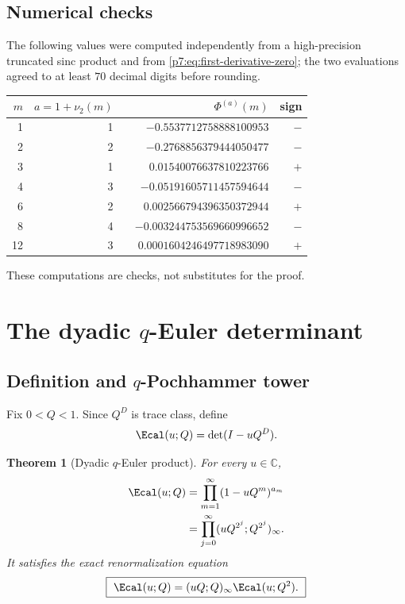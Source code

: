 \documentclass[11pt]{article}
\numberwithin{equation}{section}
\newtheorem{theorem}{Theorem}[section]
\theoremstyle{definition}
\theoremstyle{remark}
\newcommand{\C}{\mathbb C}
\begin{document}
\subsection{Numerical checks}

The following values were computed independently from a high-precision truncated sinc product and from \cref{p7:eq:first-derivative-zero}; the two evaluations agreed to at least $70$ decimal digits before rounding.
\begin{center}
\begin{tabular}{@{}rrrr@{}}
\toprule
$m$ & $a=1+\nu_2(m)$ & $\Phi^{(a)}(m)$ & sign\\
\midrule
1  & 1 & $-0.5537712758888100953$ & $-$\\
2  & 2 & $-0.2768856379444050477$ & $-$\\
3  & 1 & $\phantom{-}0.01540076637810223766$ & $+$\\
4  & 3 & $-0.05191605711457594644$ & $-$\\
6  & 2 & $\phantom{-}0.002566794396350372944$ & $+$\\
8  & 4 & $-0.003244753569660996652$ & $-$\\
12 & 3 & $\phantom{-}0.0001604246497718983090$ & $+$\\
\bottomrule
\end{tabular}
\end{center}
These computations are checks, not substitutes for the proof.

\section{The dyadic $q$-Euler determinant}

\subsection{Definition and $q$-Pochhammer tower}

Fix $0<Q<1$.  Since $Q^D$ is trace class, define
\begin{equation}\label{p7:eq:E-def}
 \Ecal(u;Q)=\det(I-uQ^D).
\end{equation}

\begin{theorem}[Dyadic $q$-Euler product]\label{p7:thm:E-product}
For every $u\in\C$,
\begin{align}
 \Ecal(u;Q)
 &=\prod_{m=1}^{\infty}(1-uQ^m)^{a_m}\label{p7:eq:E-mult}\\
 &=\prod_{j=0}^{\infty}(uQ^{2^j};Q^{2^j})_\infty.\label{p7:eq:E-tower}
\end{align}
It satisfies the exact renormalization equation
\begin{equation}\label{p7:eq:E-scale}
 \boxed{\ \Ecal(u;Q)=(uQ;Q)_\infty\Ecal(u;Q^2).\ }
\end{equation}
\end{theorem}
\end{document}
